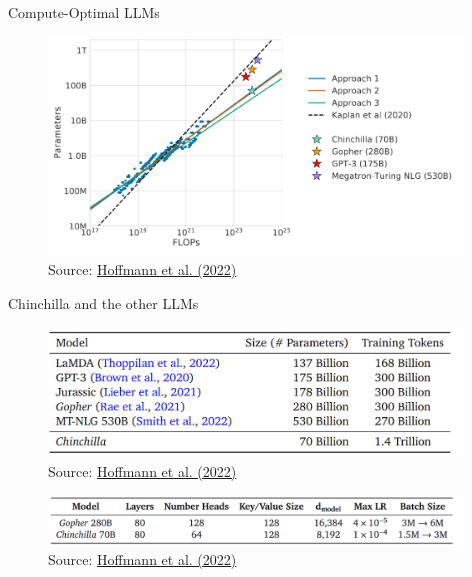 \begin{vbframe}{Compute-Optimal LLM\MakeLowercase{s}}

\vfill

\begin{figure}
	\centering
	\includegraphics[width = 11cm]{./figure/chinchilla.png} \\ 
	{\footnotesize Source: \href{https://arxiv.org/abs/2203.15556}{Hoffmann et al. (2022)}}
\end{figure}

\vfill

\end{vbframe}


\begin{vbframe}{Chinchilla and the other LLM\MakeLowercase{s}}

\vfill

\begin{figure}
	\centering
	\includegraphics[width = 11cm]{./figure/llm_params.png} \\ 
	{\footnotesize Source: \href{https://arxiv.org/abs/2203.15556}{Hoffmann et al. (2022)}}
\end{figure}

\begin{figure}
	\centering
	\includegraphics[width = 11cm]{./figure/chinchilla_gopher.png} \\ 
	{\footnotesize Source: \href{https://arxiv.org/abs/2203.15556}{Hoffmann et al. (2022)}}
\end{figure}

\vfill

\end{vbframe}

